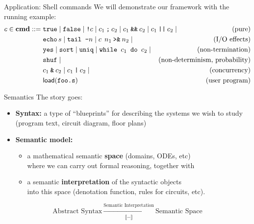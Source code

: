 \documentclass[aspectratio=1610,mathserif]{beamer}
\begin{document}
\begin{frame}{Application: Shell commands}
  We will demonstrate our framework with the running example:
  \begin{align*}
    c \in \mathbf{cmd} ::= {} &
      \texttt{true} \mid
      \texttt{false} \mid
      \texttt{!}c \mid
      c_1 \mathbin{\texttt;} c_2 \mid
      c_1 \mathbin{\texttt{\&\&}} c_2 \mid
      c_1 \mathbin{\texttt{||}} c_2 \mid {}
      & \text{(pure)}
      \\&
      \texttt{echo} \, s \mid
      \texttt{tail -}n \mid
      c \:\: n_1 \mathbin{\texttt{>\&}} n_2 \mid {}
      & \text{(I/O effects)}
      \\&
      \texttt{yes} \mid
      \texttt{sort} \mid
      \texttt{uniq} \mid
      \texttt{while } c_1 \texttt{ do } c_2 \mid {}
      & \text{(non-termination)}
      \\&
      \texttt{shuf} \mid {}
      & \hspace{-4em} \text{(non-determinism, probability)}
      \\&
      c_1 \mathbin{\texttt{\&}} c_2 \mid
      c_1 \mathbin{\texttt{|}} c_2 \mid {}
      & \text{(concurrency)}
      \\&
      \mathsf{load}(\texttt{foo.s})
      & \text{(user program)}
  \end{align*}
\end{frame}

\frame{}

\begin{frame}{Semantics} %
  The story goes:
  \begin{itemize}
    \item \textbf{Syntax:}
      a type of ``blueprints'' for describing the systems we wish to study \\
      (program text, circuit diagram, floor plans)
    \pause
    \item \textbf{Semantic model:}
      \begin{itemize}
        \item a mathematical semantic \textbf{space} (domains, ODEs, etc) \\
          where we can carry out formal reasoning, together with
        \item a semantic \textbf{interpretation} of the syntactic objects \\
          into this space (denotation function, rules for circuits, etc).
      \end{itemize}
  \end{itemize}

  \vspace{1em}
  \[
    \text{Abstract Syntax} \:
    \xrightarrow[\llbracket - \rrbracket]{\text{Semantic Interpretation}} \:
    \text{Semantic Space}
  \]
\end{frame}
\end{document}

